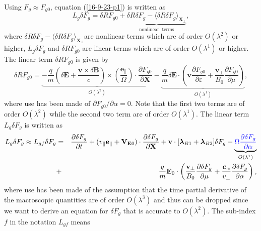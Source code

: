 \documentclass{article}
\newcommand{\tmcolor}[2]{{\color{#1}{#2}}}
\newcommand{\tmmathbf}[1]{\ensuremath{\boldsymbol{#1}}}
\newcommand{\tmop}[1]{\ensuremath{\operatorname{#1}}}
\begin{document}
Using $F_g \approx F_{g 0}$, equation (\ref{16-9-23-p1}) is written as
\begin{equation}
  \label{16-10-15-5} L_g \delta F_g = \delta R F_{g 0} + \underbrace{\delta R
  \delta F_g - \langle \delta R \delta F_g
  \rangle_{\mathbf{X}_{\perp}}}_{\tmop{nonlinear} \tmop{terms}},
\end{equation}
where $\delta R \delta F_g - \langle \delta R \delta F_g
\rangle_{\mathbf{X}_{\perp}}$are nonlinear terms which are of order $O
(\lambda^2)$ or higher, $L_g \delta F_g$ and $\delta R F_{g 0}$ are linear
terms which are of order $O (\lambda^1)$ or higher. The linear term $\delta R
F_{g 0}$ is given by
\begin{equation}
  \label{16-10-15-3} \delta R F_{g 0} = \underbrace{- \frac{q}{m} \left(
  \delta \mathbf{E}+ \frac{\mathbf{v} \times \delta \mathbf{B}}{c} \right)
  \times \left( \frac{\tmmathbf{e}_{\parallel}}{\Omega}  \right) \cdot
  \frac{\partial F_{g 0}}{\partial \mathbf{X}}}_{O (\lambda^2)} -
  \underbrace{\frac{q}{m} \delta \mathbf{E} \cdot \left( \mathbf{v}
  \frac{\partial F_{g 0}}{\partial \varepsilon} +
  \frac{\mathbf{v}_{\perp}}{B_0}  \frac{\partial F_{g 0}}{\partial \mu}
  \right)}_{O (\lambda^1)},
\end{equation}
where use has been made of $\partial F_{g 0} / \partial \alpha = 0$. Note that
the first two terms are of order $O (\lambda^2)$ while the second two term are
of order $O (\lambda^1)$. The linear term $L_g \delta F_g$ is written as
\begin{eqnarray}
  L_g \delta F_g \approx L_{g f} \delta F_g & = & \frac{\partial \delta
  F_g}{\partial t} + (v_{\parallel} \mathbf{e}_{\parallel}
  +\mathbf{V}_{\mathbf{E}0}) \cdot \frac{\partial \delta F_g}{\partial
  \mathbf{X}} +\mathbf{v} \cdot [\tmmathbf{\lambda}_{B 1}
  +\tmmathbf{\lambda}_{B 2}] \delta F_g - \underbrace{\tmcolor{blue}{\Omega
  \frac{\partial \delta F_g}{\partial \alpha}}}_{O (\lambda^1)} \nonumber\\
  & + & \frac{q}{m} \mathbf{E}_0 \cdot \left( \frac{\mathbf{v}_{\perp}}{B_0} 
  \frac{\partial \delta F_g}{\partial \mu} +
  \frac{\tmmathbf{e}_{\alpha}}{v_{\perp}}  \frac{\partial \delta F_g}{\partial
  \alpha} \right),  \label{16-11-20-2}
\end{eqnarray}
where use has been made of the assumption that the time partial derivative of
the macroscopic quantities are of order $O (\lambda^3)$ and thus can be
dropped since we want to derive an equation for $\delta F_g$ that is accurate
to $O (\lambda^2)$. The sub-index $f$ in the notation $L_{g f}$ means
\end{document}

